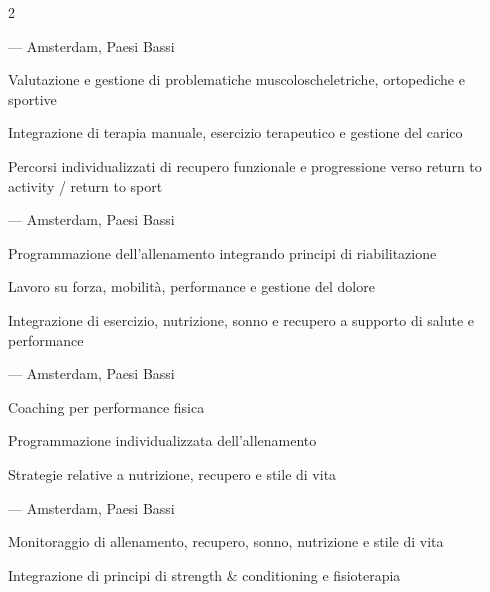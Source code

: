 \documentclass{pedricv}
\begin{document}
\begin{paracol}{2}
\switchcolumn


        { — Amsterdam, Paesi Bassi}
\begin{cvitems}
  \item Valutazione e gestione di problematiche muscoloscheletriche,
        ortopediche e sportive
  \item Integrazione di terapia manuale, esercizio terapeutico e
        gestione del carico
  \item Percorsi individualizzati di recupero funzionale e progressione verso
        return to activity / return to sport
\end{cvitems}

        { — Amsterdam, Paesi Bassi}
\begin{cvitems}
  \item Programmazione dell’allenamento integrando principi di riabilitazione
  \item Lavoro su forza, mobilità, performance e gestione del dolore
  \item Integrazione di esercizio, nutrizione, sonno e recupero a supporto di
        salute e performance
\end{cvitems}

        {
         — Amsterdam, Paesi Bassi}
\begin{cvitems}
  \item Coaching per performance fisica
  \item Programmazione individualizzata dell’allenamento
  \item Strategie relative a nutrizione, recupero e stile di vita
\end{cvitems}

        {
         — Amsterdam, Paesi Bassi}
\begin{cvitems}
  \item Monitoraggio di allenamento, recupero, sonno, nutrizione e stile di
        vita
  \item Integrazione di principi di strength \& conditioning e fisioterapia
 

\end{cvitems}
\end{paracol}
\end{document}
